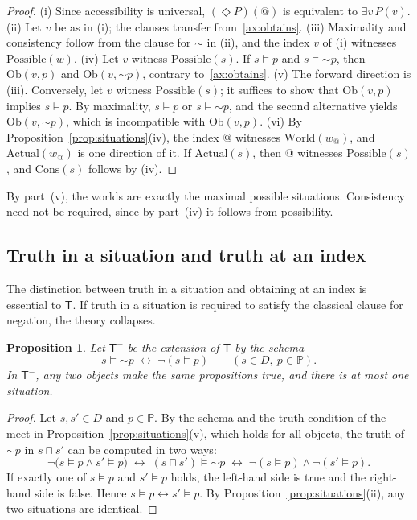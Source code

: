 \documentclass[11pt]{amsart}
\makeatletter
\theoremstyle{plain}
\newtheorem{proposition}[theorem]{Proposition}
\theoremstyle{definition}
\theoremstyle{remark}
\newcommand{\at}{@}
\newcommand{\aw}{w_{\at}}
\newcommand{\Obt}{\mathrm{Ob}}
\newcommand{\World}{\mathrm{World}}
\newcommand{\Actual}{\mathrm{Actual}}
\newcommand{\Poss}{\mathrm{Possible}}
\newcommand{\Cons}{\mathrm{Cons}}
\newcommand{\meet}{\sqcap}
\newcommand{\Prop}{\mathbb{P}}
\newcommand{\Dom}{D}
\newcommand{\T}{\mathsf{T}}
\newcommand{\pneg}{\mathord{\sim}}
\makeatother
\begin{document}
\begin{proof}
(i) Since accessibility is universal, $(\Diamond P)(\at)$ is equivalent
to $\exists v\, P(v)$.
(ii) Let $v$ be as in (i); the clauses transfer from~\ref{ax:obtains}.
(iii) Maximality and consistency follow from the clause for $\pneg$ in
(ii), and the index $v$ of (i) witnesses $\Poss(w)$.
(iv) Let $v$ witness $\Poss(s)$. If $s \models p$ and
$s \models \pneg p$, then $\Obt(v,p)$ and $\Obt(v,\pneg p)$, contrary
to~\ref{ax:obtains}.
(v) The forward direction is (iii). Conversely, let $v$ witness
$\Poss(s)$; it suffices to show that $\Obt(v,p)$ implies
$s \models p$. By maximality, $s \models p$ or $s \models \pneg p$, and
the second alternative yields $\Obt(v,\pneg p)$, which is incompatible
with $\Obt(v,p)$.
(vi) By Proposition~\ref{prop:situations}(iv), the index $\at$
witnesses $\World(\aw)$, and $\Actual(\aw)$ is one direction of it. If
$\Actual(s)$,
then $\at$ witnesses $\Poss(s)$, and $\Cons(s)$ follows by (iv).
\end{proof}

By part~(v), the worlds are exactly the maximal possible situations.
Consistency need not be required, since by part~(iv) it follows from
possibility.

\subsection{Truth in a situation and truth at an index}

The distinction between truth in a situation and obtaining at an index
is essential to $\T$. If truth in a situation is required to satisfy
the classical clause for negation, the theory collapses.

\begin{proposition}
\label{prop:collapse}
Let $\T^-$ be the extension of $\T$ by the schema
\[
  s \models \pneg p \;\leftrightarrow\; \neg(s \models p)
  \qquad (s \in \Dom,\ p \in \Prop).
\]
In $\T^-$, any two objects make the same propositions true, and there
is at most one situation.
\end{proposition}

\begin{proof}
Let $s, s' \in \Dom$ and $p \in \Prop$. By the schema and the truth
condition of the meet in Proposition~\ref{prop:situations}(v), which
holds for all objects, the truth of $\pneg p$ in $s \meet s'$ can
be computed in two ways:
\[
  \neg\bigl(s \models p \wedge s' \models p\bigr)
  \;\leftrightarrow\; (s \meet s') \models \pneg p
  \;\leftrightarrow\; \neg(s \models p) \wedge \neg(s' \models p).
\]
If exactly one of $s \models p$ and $s' \models p$ holds, the left-hand
side is true and the right-hand side is false. Hence
$s \models p \leftrightarrow s' \models p$. By
Proposition~\ref{prop:situations}(ii), any two situations are
identical.
\end{proof}
\end{document}
